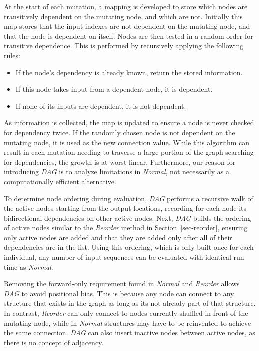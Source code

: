 \documentclass{sig-alternate}
\begin{document}
At the start of each mutation, a mapping is developed to store which nodes are
transitively dependent on the mutating node, and which are not.  Initially this map stores that
the input indexes are not dependent on the mutating node, and
that the node is dependent on itself.  Nodes are then tested in a random
order for transitive dependence.  This is performed by recursively applying
the following rules:
\begin{itemize}
  \item If the node's dependency is already known, return the stored information.
  \item If this node takes input from a dependent node, it is dependent.
  \item If none of its inputs are dependent, it is not dependent.
\end{itemize}
As information is collected, the map is updated to ensure a node is never checked
for dependency twice.  If the randomly chosen node is not dependent on the mutating
node, it is used as the new connection value. While this algorithm can result in
each mutation needing to traverse a large portion of the graph searching for
dependencies, the growth is at worst linear.  Furthermore, our reason for
introducing \emph{DAG} is to analyze limitations in \emph{Normal}, not necessarily as
a computationally efficient alternative.

To determine node ordering during evaluation, \emph{DAG}
performs a recursive walk of the active nodes starting from the output
locations, recording for each node its bidirectional dependencies on other active nodes.
Next, \emph{DAG} builds the ordering of active nodes similar to
the \emph{Reorder} method in Section~\ref{sec-reorder}, ensuring only active nodes are added
and that they are added only after all of their dependencies are in the list.
Using this ordering, which is only built once for each individual, any number of
input sequences can be evaluated with identical run time as \emph{Normal}.

Removing the forward-only requirement found in \emph{Normal} and \emph{Reorder}
allows \emph{DAG} to avoid positional bias.
This is because any node can connect to any structure
that exists in the graph as long as its not already part of that structure.  
In contrast, \emph{Reorder} can only connect to nodes currently shuffled
in front of the mutating node, while in \emph{Normal} structures may have
to be reinvented to achieve the same connection.  \emph{DAG} can also
insert inactive nodes between active nodes, as there is
no concept of adjacency.
\end{document}

